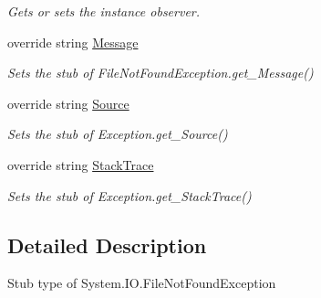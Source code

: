 \begin{DoxyCompactItemize}
\begin{DoxyCompactList}\small\item\em Gets or sets the instance observer.\end{DoxyCompactList}\item 
override string \hyperlink{class_system_1_1_i_o_1_1_fakes_1_1_stub_file_not_found_exception_af31a8a8752e4bc80b2d838b35fe85303}{Message}
\begin{DoxyCompactList}\small\item\em Sets the stub of File\-Not\-Found\-Exception.\-get\-\_\-\-Message()\end{DoxyCompactList}\item 
override string \hyperlink{class_system_1_1_i_o_1_1_fakes_1_1_stub_file_not_found_exception_ae63572c452a46ff7b68544c24cd843ec}{Source}
\begin{DoxyCompactList}\small\item\em Sets the stub of Exception.\-get\-\_\-\-Source()\end{DoxyCompactList}\item 
override string \hyperlink{class_system_1_1_i_o_1_1_fakes_1_1_stub_file_not_found_exception_ac65aabd9aa5be70dde409b8466e59fcc}{Stack\-Trace}
\begin{DoxyCompactList}\small\item\em Sets the stub of Exception.\-get\-\_\-\-Stack\-Trace()\end{DoxyCompactList}\end{DoxyCompactItemize}


\subsection{Detailed Description}
Stub type of System.\-I\-O.\-File\-Not\-Found\-Exception



